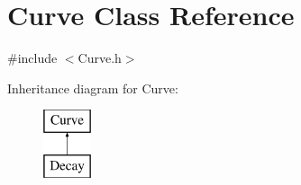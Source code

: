 \hypertarget{class_curve}{}\section{Curve Class Reference}
\label{class_curve}


{\ttfamily \#include $<$Curve.\+h$>$}

Inheritance diagram for Curve\+:\begin{figure}[H]
\begin{center}
\leavevmode
\includegraphics[height=2.000000cm]{class_curve}
\end{center}
\end{figure}
